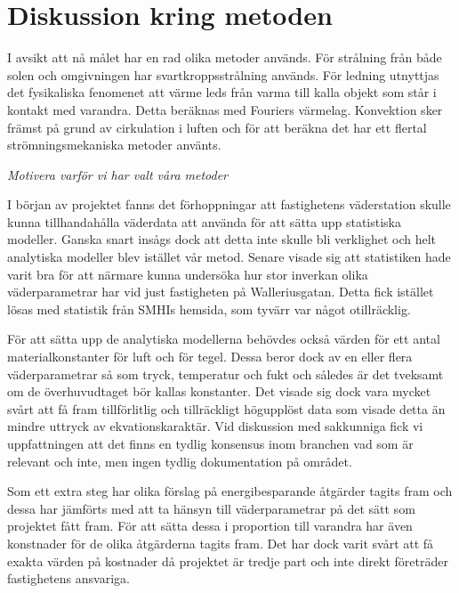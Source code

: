 \section{Diskussion kring metoden}

I avsikt att nå målet har en rad olika metoder används. För strålning från både solen och omgivningen har svartkroppsstrålning används. För ledning utnyttjas det fysikaliska fenomenet att värme leds från varma till kalla objekt som står i kontakt med varandra. Detta beräknas med Fouriers värmelag. Konvektion sker främst på grund av cirkulation i luften och för att beräkna det har ett flertal strömningsmekaniska metoder använts.

\emph{\color{red} Motivera varför vi har valt våra metoder}

I början av projektet fanns det förhoppningar att fastighetens väderstation skulle kunna tillhandahålla väderdata att använda för att sätta upp statistiska modeller. 
Ganska snart insågs dock att detta inte skulle bli verklighet och helt analytiska modeller blev istället vår metod. Senare visade sig att statistiken hade varit bra för att närmare kunna undersöka hur stor inverkan olika väderparametrar har vid just fastigheten på Walleriusgatan. 
Detta fick istället lösas med statistik från SMHIs hemsida, som tyvärr var något otillräcklig.

För att sätta upp de analytiska modellerna behövdes också värden för ett antal materialkonstanter för luft och för tegel. 
Dessa beror dock av en eller flera väderparametrar så som tryck, temperatur och fukt och således är det tveksamt om de överhuvudtaget bör kallas konstanter. 
Det visade sig dock vara mycket svårt att få fram tillförlitlig och tillräckligt högupplöst data som visade detta än mindre uttryck av ekvationskaraktär.
Vid diskussion med sakkunniga fick vi uppfattningen att det finns en tydlig konsensus inom branchen vad som är relevant och inte, men ingen tydlig dokumentation på området.

Som ett extra steg har olika förslag på energibesparande åtgärder tagits fram och dessa har jämförts med att ta hänsyn till väderparametrar på det sätt som projektet fått fram. För att sätta dessa i proportion till varandra har även konstnader för de olika åtgärderna tagits fram. Det har dock varit svårt att få exakta värden på kostnader då projektet är tredje part och inte direkt företräder fastighetens ansvariga.
